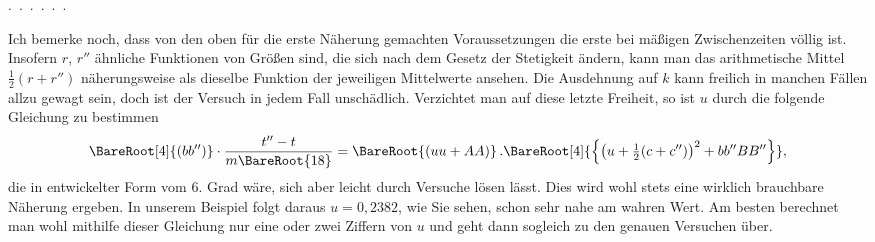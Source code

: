 \pagebreak
{}\noindent\hspace*{\parindent}.\ .\ .\ .\ .\ .\par
Ich bemerke noch, dass von den oben für die erste Näherung gemachten Voraussetzungen die erste bei mäßigen Zwischenzeiten völlig  ist. Insofern \(r\), \(r''\) ähnliche Funktionen von Größen sind, die sich nach dem Gesetz der Stetigkeit ändern, kann man das arithmetische Mittel \(\tfrac12(r+r'')\) näherungsweise als dieselbe Funktion der jeweiligen Mittelwerte ansehen. Die Ausdehnung auf \(k\) kann freilich in manchen Fällen allzu gewagt sein, doch ist der Versuch in jedem Fall unschädlich. Verzichtet man auf diese letzte Freiheit, so ist \(u\) durch die folgende Gleichung zu bestimmen
\[
\BareRoot[4]{(bb'')}\cdot\frac{t''-t}{m\BareRoot{18}}=\BareRoot{(uu+AA)}\,.\BareRoot[4]{\left\{\bigl(u+\tfrac12(c+c'')\bigr)^2+bb''BB''\right\}},
\]
die in entwickelter Form vom 6. Grad wäre, sich aber leicht durch Versuche lösen lässt. Dies wird wohl stets eine wirklich brauchbare Näherung ergeben. In unserem Beispiel folgt daraus \(u=0{,}2382\), wie Sie sehen, schon sehr nahe am wahren Wert. Am besten berechnet man wohl mithilfe dieser Gleichung nur eine oder zwei Ziffern von \(u\) und geht dann sogleich zu den genauen Versuchen über.
\par\medskip\noindent\makebox[\linewidth]{\rule{.18\linewidth}{.35pt}}\par
